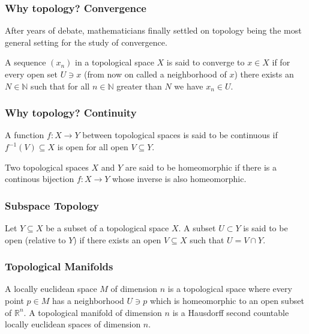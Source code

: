 \documentclass{beamer}
\begin{document}
\begin{frame}

\frametitle{Why topology? Convergence}

After years of debate, mathematicians finally settled on topology being the most general setting for the study of convergence.

\begin{definition}
A sequence $(x_n)$ in a topological space $X$ is said to converge to $x\in X$ if for every open set $U\ni x$ (from now on called a neighborhood of $x$) there exists an $N\in\mathbb{N}$ such that for all $n\in\mathbb{N}$ greater than $N$ we have $x_n\in U$.
\end{definition}

\end{frame}

\begin{frame}

\frametitle{Why topology? Continuity}

\begin{definition}
A function $f:X\rightarrow Y$ between topological spaces is said to be continuous if $f^{-1}(V)\subseteq X$ is open for all open $V\subseteq Y$.
\end{definition}

\begin{definition}
Two topological spaces $X$ and $Y$ are said to be homeomorphic if there is a continous bijection $f:X\rightarrow Y$ whose inverse is also homeomorphic. 
\end{definition}

\end{frame}

\begin{frame}

\frametitle{Subspace Topology}

\begin{definition}
Let $Y\subseteq X$ be a subset of a topological space $X$. A subset $U\subset Y$ is said to be open (relative to $Y$) if there exists an open $V\subseteq X$ such that $U=V\cap Y$.
\end{definition}

\end{frame}

\begin{frame}

\frametitle{Topological Manifolds}

\begin{definition}
A locally euclidean space $M$ of dimension $n$ is a topological space where every point $p\in M$ has a neighborhood $U\ni p$ which is homeomorphic to an open subset of $\mathbb{R}^n$. A topological manifold of dimension $n$ is a Hausdorff second countable locally euclidean spaces of dimension $n$. 
\end{definition}

\end{frame}
\end{document}
